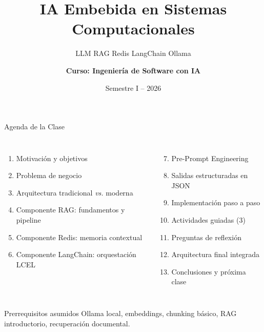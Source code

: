 \documentclass[aspectratio=169]{beamer}
\title[IA Embebida en Sistemas]{\textbf{IA Embebida en Sistemas Computacionales}}
\subtitle{LLM \textbullet{} RAG \textbullet{} Redis \textbullet{} LangChain \textbullet{} Ollama}
\author[Ing. Informática]{\textbf{Curso: Ingeniería de Software con IA}}
\institute[Universidad]{Departamento de Ciencias de la Computación}
\date{Semestre I -- 2026}
\begin{document}
\begin{frame}
  \titlepage
\end{frame}

\begin{frame}{Agenda de la Clase}
  \begin{columns}
      \begin{enumerate}
        \item Motivación y objetivos
        \item Problema de negocio
        \item Arquitectura tradicional \textit{vs.} moderna
        \item Componente RAG: fundamentos y pipeline
        \item Componente Redis: memoria contextual
        \item Componente LangChain: orquestación LCEL
      \end{enumerate}
      \begin{enumerate}
        \setcounter{enumi}{6}
        \item Pre-Prompt Engineering
        \item Salidas estructuradas en JSON
        \item Implementación paso a paso
        \item Actividades guiadas (3)
        \item Preguntas de reflexión
        \item Arquitectura final integrada
        \item Conclusiones y próxima clase
      \end{enumerate}
  \end{columns}
  \vspace{0.8em}
  \begin{exampleblock}{Prerrequisitos asumidos}
    Ollama local, embeddings, chunking básico, RAG introductorio, recuperación documental.
  \end{exampleblock}
\end{frame}
\end{document}
